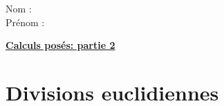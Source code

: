 \documentclass[a4paper,12pt]{article}
\begin{document}
\noindent Nom : \hspace{6cm} \\[0.4cm]
\noindent Prénom : \hspace{6cm}

\vspace{1cm}

\begin{center}
    {\Huge \underline{\textbf{Calculs posés: partie 2}}}\\[0.5cm]
\end{center}

\vspace{0.5cm}

\section*{Divisions euclidiennes}

\vspace{1cm}
\end{document}
